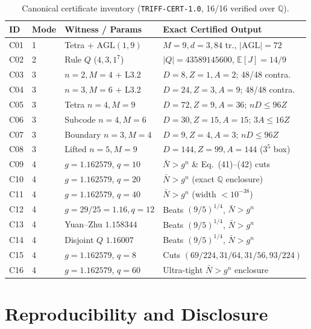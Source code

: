 \documentclass[10pt,twocolumn]{article}
\begin{document}
\begin{table}[t]
\centering
\caption{Canonical certificate inventory (\texttt{TRIFF-CERT-1.0}, 16/16 verified over $\mathbb{Q}$).}
\label{tab:certs}
\scriptsize
\setlength{\tabcolsep}{1.2pt}
\begin{tabular}{@{}llll@{}}
\toprule
ID & Mode & Witness / Params & Exact Certified Output \\
\midrule
C01 & 1 & Tetra + $\mathrm{AGL}(1,9)$ & $M{=}9, d{=}3, 84$ tr., $|\mathrm{AGL}|{=}72$ \\
C02 & 2 & Rule $Q$ ($4,3,1^7$) & $|Q|{=}43589145600$, $\mathbb{E}[J]{=}14/9$ \\
C03 & 3 & $n{=}2, M{=}4$ + L3.2 & $D{=}8, Z{=}1, A{=}2$; 48/48 contra. \\
C04 & 3 & $n{=}3, M{=}6$ + L3.2 & $D{=}24, Z{=}3, A{=}9$; 48/48 contra. \\
C05 & 3 & Tetra $n{=}4, M{=}9$ & $D{=}72, Z{=}9, A{=}36$; $nD{\le}96Z$ \\
C06 & 3 & Subcode $n{=}4, M{=}6$ & $D{=}30, Z{=}15, A{=}15$; $3A{\le}16Z$ \\
C07 & 3 & Boundary $n{=}3, M{=}4$ & $D{=}9, Z{=}4, A{=}3$; $nD{\le}96Z$ \\
C08 & 3 & Lifted $n{=}5, M{=}9$ & $D{=}144, Z{=}99, A{=}144$ ($3^5$ box) \\
C09 & 4 & $g{=}1.162579$, $q{=}10$ & $\bar{N}{>}g^n$ \& Eq.~(41)--(42) cuts \\
C10 & 4 & $g{=}1.162579$, $q{=}20$ & $\bar{N}{>}g^n$ (exact $\mathbb{Q}$ enclosure) \\
C11 & 4 & $g{=}1.162579$, $q{=}40$ & $\bar{N}{>}g^n$ (width $<10^{-38}$) \\
C12 & 4 & $g{=}29/25{=}1.16, q{=}12$ & Beats $(9/5)^{1/4}$, $\bar{N}{>}g^n$ \\
C13 & 4 & Yuan--Zhu $1.158344$ & Beats $(9/5)^{1/4}$, $\bar{N}{>}g^n$ \\
C14 & 4 & Disjoint $Q$ $1.16007$ & Beats $(9/5)^{1/4}$, $\bar{N}{>}g^n$ \\
C15 & 4 & $g{=}1.162579$, $q{=}8$ & Cuts $(69/224,31/64,31/56,93/224)$ \\
C16 & 4 & $g{=}1.162579$, $q{=}60$ & Ultra-tight $\bar{N}{>}g^n$ enclosure \\
\bottomrule
\end{tabular}
\end{table}

\section{Reproducibility and Disclosure}
\end{document}
